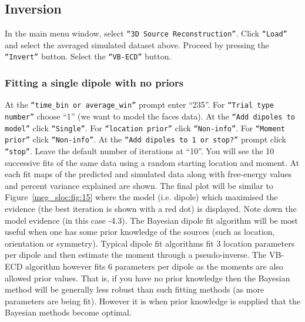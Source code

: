 \subsection{Inversion}
In the main menu window, select \texttt{``3D Source Reconstruction''}. Click \texttt{``Load''} and select the averaged simulated dataset above.
Proceed by pressing the \texttt{``Invert''} button. Select the \texttt{``VB-ECD''} button.

\subsubsection{Fitting a single dipole with no priors}
At the \texttt{``time\_bin or average\_win''} prompt enter ``235''. For \texttt{``Trial type number''} choose ``1'' (we want to model the faces data). At the \texttt{``Add dipoles to model''} click \texttt{``Single''}. For \texttt{``location prior''} click \texttt{``Non-info''}. For \texttt{``Moment prior''} click \texttt{``Non-info''}. At the \texttt{``Add dipoles to 1 or stop?''} prompt click \texttt{``stop''}. Leave the default number of iterations at ``10''.
You will see the 10 successive fits of the same data using a random starting location and moment. At each fit maps of the predicted and simulated data along with free-energy values and percent variance explained are shown. The final plot will be similar to Figure~\ref{meg_sloc:fig:15} where the model (i.e. dipole) which maximised the evidence (the best iteration is shown with a red dot) is displayed. Note down the model evidence (in this case -4.3). The Bayesian dipole fit algorithm will be most useful when one has some prior knowledge of the sources (such as location, orientation or symmetry). Typical dipole fit algorithms fit 3 location parameters per dipole and then estimate the moment through a pseudo-inverse. The VB-ECD algorithm however fits 6 parameters per dipole as the moments are also allowed prior values. That is, if you have no prior knowledge then the Bayesian method will be generally less robust than such fitting methods (as more parameters are being fit). However it is when prior knowledge is supplied that the Bayesian methods become optimal.

